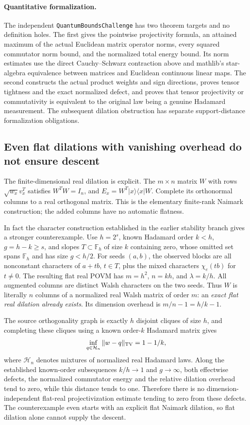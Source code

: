 \paragraph{Quantitative formalization.}
The independent \texttt{QuantumBoundsChallenge} has two theorem
targets and no definition holes. The first gives the pointwise
projectivity formula, an attained maximum of the actual Euclidean
matrix operator norms, every squared commutator norm bound, and the
normalized total energy bound. Its norm estimates use the direct
Cauchy--Schwarz contraction above and mathlib's star-algebra
equivalence between matrices and Euclidean continuous linear maps.
The second constructs the actual product weights and sign directions,
proves tensor tightness and the exact normalized defect, and proves
that tensor projectivity or commutativity is equivalent to the
original law being a genuine Hadamard measurement.
The subsequent dilation obstruction has separate support-distance
formalization obligations.

\subsection{Even flat dilations with vanishing overhead do not ensure descent}
The finite-dimensional real dilation is explicit. The $m\times n$
matrix $W$ with rows $\sqrt{w_x}v_x^T$ satisfies $W^TW=I_n$, and
$E_x=W^T|x\rangle\langle x|W$. Complete its orthonormal columns to
a real orthogonal matrix. This is the elementary finite-rank
Naimark construction; the added columns have no automatic flatness.

In fact the character construction established in the earlier
stability branch gives a stronger counterexample. Use $h=2^s$,
known Hadamard order $k<h$, $g=h-k\ge s$, and slopes
$T\subset\mathbb F_h$ of size $k$ containing zero, whose omitted
set spans $\mathbb F_h$ and has size $g<h/2$.
For seeds $(a,b)$, the observed blocks are all nonconstant characters
of $a+tb$, $t\in T$, plus the mixed characters $\chi_e(tb)$ for
$t\ne0$. The resulting flat real POVM has
$m=h^2$, $n=kh$, and $\lambda=k/h$.
All augmented columns are distinct Walsh characters on the two
seeds. Thus $W$ is literally $n$ columns of a normalized real Walsh
matrix of order $m$: an \emph{exact flat real dilation already exists}.
Its dimension overhead is $m/n-1=h/k-1$.

The source orthogonality graph is exactly $h$ disjoint cliques of
size $h$, and completing these cliques using a known order-$k$
Hadamard matrix gives
\[
 \inf_{q\in\mathcal H_n}\|w-q\|_{\rm TV}=1-1/k,
\]
where $\mathcal H_n$ denotes mixtures of normalized real Hadamard
laws. Along the established known-order subsequences $k/h\to1$ and
$g\to\infty$, both effectwise defects, the normalized commutator
energy and the relative dilation overhead tend to zero, while this
distance tends to one. Therefore there is no dimension-independent
flat-real projectivization estimate tending to zero from these
defects. The counterexample even starts with an explicit flat
Naimark dilation, so flat dilation alone cannot supply the descent.

